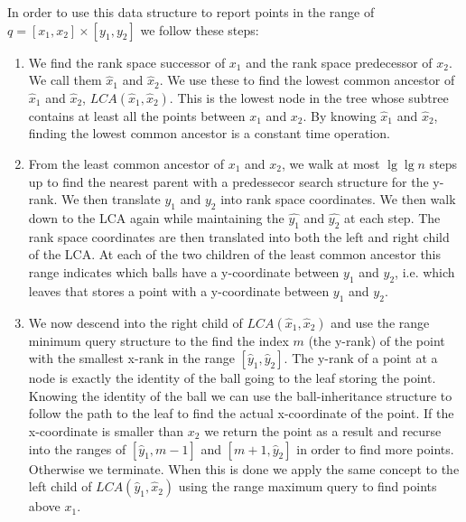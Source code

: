 In order to use this data structure to report points in the range of $q = [x_1, x_2] \times [y_1, y_2]$ we follow these steps:
\begin{enumerate}
  \item We find the rank space successor of $x_1$ and the rank space predecessor of $x_2$. We call them $\hat{x}_1$ and $\hat{x}_2$. We use these to find the lowest common ancestor of $\hat{x}_1$ and $\hat{x}_2$, $LCA(\hat{x}_1, \hat{x}_2)$. This is the lowest node in the tree whose subtree contains at least all the points between $x_1$ and $x_2$. By knowing $\hat{x}_1$ and $\hat{x}_2$, finding the lowest common ancestor is a constant time operation.   
  \item From the least common ancestor of $x_1$ and $x_2$, we walk at most $\lg \lg n$ steps up to find the nearest parent with a predessecor search structure for the y-rank. We then translate $y_1$ and $y_2$ into rank space coordinates. We then walk down to the LCA again while maintaining the $\hat{y_1}$ and $\hat{y_2}$ at each step. The rank space coordinates are then translated into both the left and right child of the LCA. At each of the two children of the least common ancestor this range indicates which balls have a y-coordinate between $y_1$ and $y_2$, i.e. which leaves that stores a point with a y-coordinate between $y_1$ and $y_2$.
  \item We now descend into the right child of $LCA(\hat{x}_1, \hat{x}_2)$ and use the range minimum query structure to the find the index $m$ (the y-rank) of the point with the smallest x-rank in the range $[\hat{y}_1, \hat{y}_2]$. The y-rank of a point at a node is exactly the identity of the ball going to the leaf storing the point. Knowing the identity of the ball we can use the ball-inheritance structure to follow the path to the leaf to find the actual x-coordinate of the point. If the x-coordinate is smaller than $x_2$ we return the point as a result and recurse into the ranges of $[\hat{y}_1, m-1]$ and $[m+1, \hat{y}_2]$ in order to find more points. Otherwise we terminate. When this is done we apply the same concept to the left child of $LCA(\hat{y}_1, \hat{x}_2)$ using the range maximum query to find points above $x_1$.
\end{enumerate}


